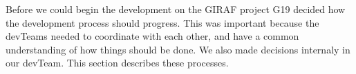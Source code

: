 Before we could begin the development on the GIRAF project \gls{G19} decided how the development process should progress.
This was important because the \glspl{devTeam} needed to coordinate with each other, and have a common understanding of how things should be done.
We also made decisions internaly in our \gls{devTeam}. 
This section describes these processes. 
